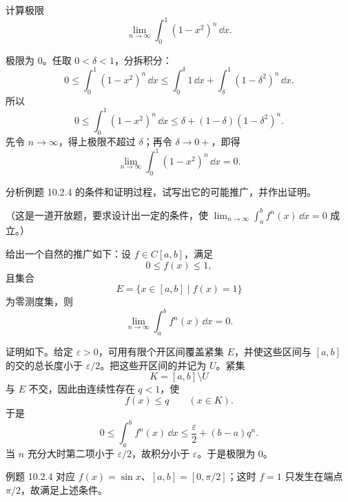 \begin{xexercise}[4]
计算极限
\[
  \lim_{n\to\infty}\int_0^1(1-x^2)^n\,\dd x.
\]
\end{xexercise}
\begin{xsolution}
极限为 $0$。任取 $0<\delta<1$，分拆积分：
\[
  0\leqslant\int_0^1(1-x^2)^n\,\dd x
  \leqslant
  \int_0^\delta1\,\dd x+
  \int_\delta^1(1-\delta^2)^n\,\dd x.
\]
所以
\[
  0\leqslant\int_0^1(1-x^2)^n\,\dd x
  \leqslant\delta+(1-\delta)(1-\delta^2)^n.
\]
先令 $n\to\infty$，得上极限不超过 $\delta$；再令 $\delta\to0+$，即得
\[
  \boxed{\lim_{n\to\infty}\int_0^1(1-x^2)^n\,\dd x=0}.
\]
\end{xsolution}


\begin{xexercise}[5]
分析例题 10.2.4 的条件和证明过程，试写出它的可能推广，并作出证明。

（这是一道开放题，要求设计出一定的条件，使 $\lim_{n\to\infty}\int_a^b f^n(x)\,\dd x=0$ 成立。）
\end{xexercise}
\begin{xsolution}
给出一个自然的推广如下：设 $f\in C[a,b]$，满足
\[
  0\leqslant f(x)\leqslant1,
\]
且集合
\[
  E=\{x\in[a,b]\mid f(x)=1\}
\]
为零测度集，则
\[
  \lim_{n\to\infty}\int_a^b f^n(x)\,\dd x=0.
\]

证明如下。给定 $\varepsilon>0$，可用有限个开区间覆盖紧集 $E$，并使这些区间与 $[a,b]$ 的交的总长度小于 $\varepsilon/2$。把这些开区间的并记为 $U$。紧集
\[
  K=[a,b]\setminus U
\]
与 $E$ 不交，因此由连续性存在 $q<1$，使
\[
  f(x)\leqslant q\qquad(x\in K).
\]
于是
\[
  0\leqslant\int_a^b f^n(x)\,\dd x
  \leqslant\frac\varepsilon2+(b-a)q^n.
\]
当 $n$ 充分大时第二项小于 $\varepsilon/2$，故积分小于 $\varepsilon$。于是极限为 $0$。

例题 10.2.4 对应 $f(x)=\sin x$、$[a,b]=[0,\pi/2]$；这时 $f=1$ 只发生在端点 $\pi/2$，故满足上述条件。
\end{xsolution}


